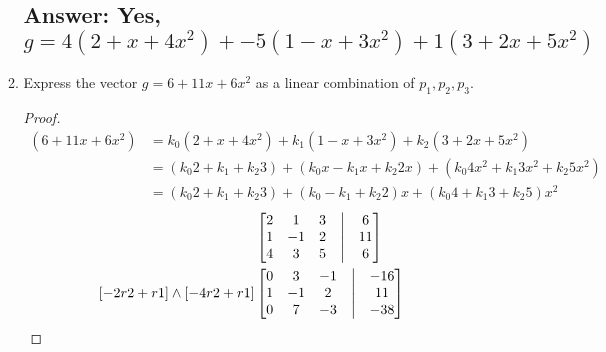 \documentclass[12pt]{article}
\begin{document}
\begin{enumerate}
\begin{enumerate}
                      \subsection{Answer: Yes, $g =  4(2 + x + 4x^2) +  -5(1 - x + 3x^2) +  1(3 + 2x + 5x^2)$}
                      \item Express the vector $g = 6 + 11x + 6x^2$ as a linear combination of $p_1,p_2,p_3$.
                            \begin{proof}
                                    \begin{align*}
                                            (6 + 11x + 6x^2) & =  k_{0}(2 + x + 4x^2) +  k_{1}(1 - x + 3x^2) +  k_{2}(3 + 2x + 5x^2)                                \\
                                                             & =  (k_{0}2 + k_{1} + k_{2}3)  +  (k_{0}x - k_{1}x + k_{2}2x)  +  (k_{0}4x^2 + k_{1}3x^2 + k_{2}5x^2) \\
                                                             & =  (k_{0}2 + k_{1} + k_{2}3)  +  (k_{0} - k_{1} + k_{2}2)x    +  (k_{0}4 + k_{1}3 + k_{2}5)x^2
                                    \end{align*}
                                    \begin{align*}
                                             &
                                            \begin{bmatrix}
                                                    2 & 1  & 3 & \bigm| & 6  \\
                                                    1 & -1 & 2 & \bigm| & 11 \\
                                                    4 & 3  & 5 & \bigm| & 6  \\
                                            \end{bmatrix} \\
                                            [-2r2+r1] \wedge [-4r2+r1]
                                             &
                                            \begin{bmatrix}
                                                    0 & 3  & -1 & \bigm| & -16 \\
                                                    1 & -1 & 2  & \bigm| & 11  \\
                                                    0 & 7  & -3 & \bigm| & -38 \\
                                            \end{bmatrix} \\

\end{align*}
\end{proof}
\end{enumerate}
\end{enumerate}
\end{document}
